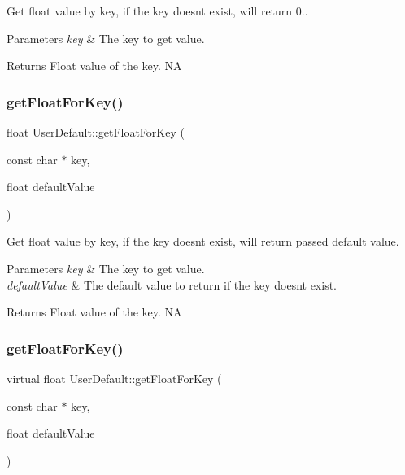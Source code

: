 Get float value by key, if the key doesn\textquotesingle{}t exist, will return 0.. 
\begin{DoxyParams}{Parameters}
{\em key} & The key to get value. \\
\hline
\end{DoxyParams}
\begin{DoxyReturn}{Returns}
Float value of the key.  NA 
\end{DoxyReturn}
\mbox{\label{classUserDefault_afa9d19fccb8eadd64500c62362c02bb1}} 
\subsubsection{\texorpdfstring{get\+Float\+For\+Key()}{getFloatForKey()}\hspace{0.1cm}{\footnotesize\ttfamily [3/4]}}
{\footnotesize\ttfamily float User\+Default\+::get\+Float\+For\+Key (\begin{DoxyParamCaption}\item[{const char $\ast$}]{key,  }\item[{float}]{default\+Value }\end{DoxyParamCaption})\hspace{0.3cm}{\ttfamily [virtual]}}

Get float value by key, if the key doesn\textquotesingle{}t exist, will return passed default value. 
\begin{DoxyParams}{Parameters}
{\em key} & The key to get value. \\
\hline
{\em default\+Value} & The default value to return if the key doesn\textquotesingle{}t exist. \\
\hline
\end{DoxyParams}
\begin{DoxyReturn}{Returns}
Float value of the key.  NA 
\end{DoxyReturn}
\mbox{\label{classUserDefault_aa6f1c1d8cf6e4286abe397b0f03087bd}} 
\subsubsection{\texorpdfstring{get\+Float\+For\+Key()}{getFloatForKey()}\hspace{0.1cm}{\footnotesize\ttfamily [4/4]}}
{\footnotesize\ttfamily virtual float User\+Default\+::get\+Float\+For\+Key (\begin{DoxyParamCaption}\item[{const char $\ast$}]{key,  }\item[{float}]{default\+Value }\end{DoxyParamCaption})\hspace{0.3cm}{\ttfamily [virtual]}}

